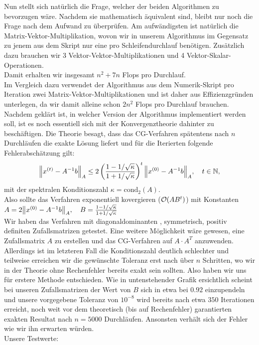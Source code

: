 Nun stellt sich natürlich die Frage, welcher der beiden Algorithmen zu bevorzugen wäre.
Nachdem sie mathematisch äquivalent sind, bleibt nur noch die Frage nach dem Aufwand zu überprüfen.
Am aufwändigsten ist natürlich die Matrix-Vektor-Multiplikation, wovon wir in unserem Algorithmus
im Gegensatz zu jenem aus dem Skript nur eine pro Schleifendurchlauf benötigen.
Zusätzlich dazu brauchen wir 3 Vektor-Vektor-Multiplikationen und 4 Vektor-Skalar-Operationen. \\
Damit erhalten wir insgesamt $n^2+7n$ Flops pro Durchlauf. \\
Im Vergleich dazu verwendet der Algorithmus aus dem Numerik-Skript pro Iteration zwei Matrix-Vektor-Multiplikationen
und ist daher aus Effizienzgründen unterlegen, da wir damit alleine schon $2n^2$ Flops pro Durchlauf brauchen. \\

Nachdem geklärt ist, in welcher Version der Algorithmus implementiert werden soll, ist es noch essentiell sich mit der
Konvergenztheorie dahinter zu beschäftigen.
Die Theorie besagt, dass das CG-Verfahren spätentens nach $n$ Durchläufen die exakte Lösung liefert und für die Iterierten
folgende Fehlerabschätzung gilt:
\begin{align*}
  {\left \| x^{(t)}-A^{-1}b \right \|}_A \leq 2\left(\frac{1-1/\sqrt{\kappa}}{1+1/\sqrt{\kappa}}\right)^t{\left \| x^{(0)}-A^{-1}b \right \|}_A, \quad t \in \mathbb{N},
\end{align*}
mit der spektralen Konditionszahl $\kappa = \text{cond}_2(A)$. \\
Also sollte das Verfahren exponentiell kovergieren ($\mathcal{O} {\left ( AB^t \right )}$) mit Konstanten\\
$A = 2{\left \| x^{(0)}-A^{-1}b \right \|}_A, \quad B = \frac{1-1/\sqrt{\kappa}}{1+1/\sqrt{\kappa}}$\\
Wir haben das Verfahren mit diagonaldominanten , symmetrisch, positiv definiten Zufallsmatrizen getestet. Eine weitere
Möglichkeit wäre gewesen, eine Zufallsmatrix $A$ zu erstellen und das CG-Verfahren auf $A\cdot A^T$ anzuwenden. Allerdings ist
im letzteren Fall die Konditionszahl deutlich schlechter und teilweise erreichen wir die gewünschte Toleranz erst nach über $n$
Schritten, wo wir in der Theorie ohne Rechenfehler bereits exakt sein sollten. Also haben wir uns für erstere Methode entschieden.
Wie in untenstehender Grafik ersichtlich scheint bei unseren Zufallsmatrizen der Wert von $B$ sich in etwa bei $0.92$ einzupendeln
und unsere vorgegebene Toleranz von $10^{-8}$ wird bereits nach etwa $350$ Iterationen erreicht, noch weit vor dem theoretisch
(bis auf Rechenfehler) garantierten exakten Resultat nach $n = 5000$ Durchläufen.
Ansonsten verhält sich der Fehler wie wir ihn erwarten würden. \\
Unsere Testwerte: \\

